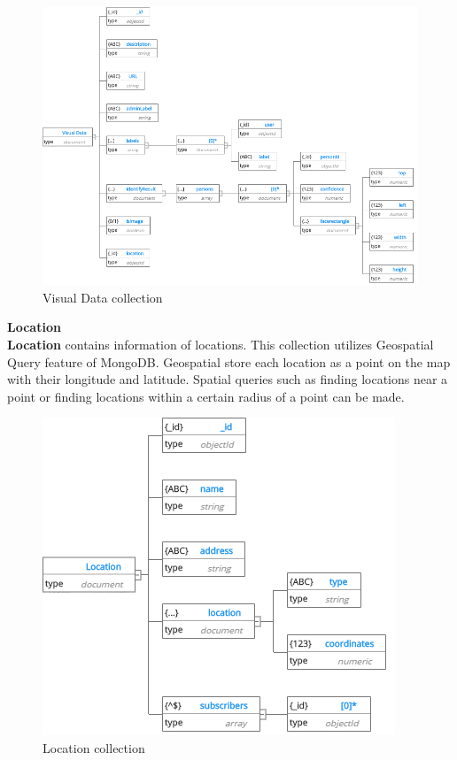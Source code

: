 \begin{center}
	\begin{figure}[H]
		\centering
		\includegraphics[width=1\columnwidth]{images/chap4/Visual.png}
		\caption{Visual Data collection}
	\end{figure}
\end{center}
\cleardoublepage
\textbf{Location}\\
\textbf{Location} contains information of locations. This collection utilizes Geospatial Query feature of MongoDB. Geospatial store each location as a point on the map with their longitude and latitude. Spatial queries such as finding locations near a point or finding locations within a certain radius of a point can be made.
\begin{center}
	\begin{figure}[H]
		\centering
		\includegraphics[width=1\columnwidth]{images/chap4/Location.png}
		\caption{Location collection}
	\end{figure}
\end{center}
